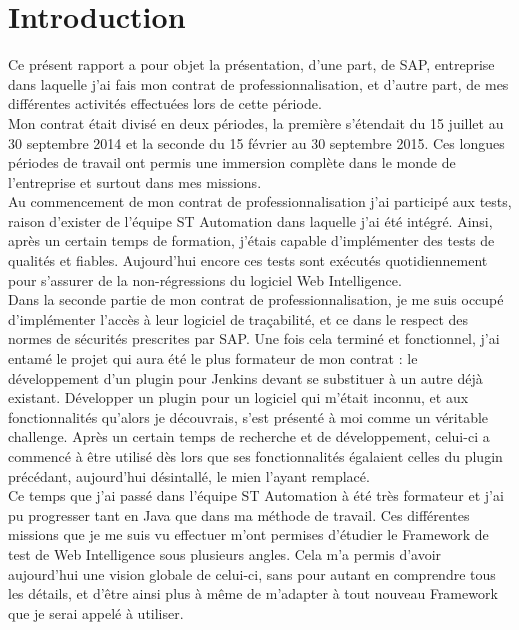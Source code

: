 \chapter*{Introduction}

Ce présent rapport a pour objet la présentation, d'une part, de SAP, entreprise dans laquelle j'ai fais mon contrat de professionnalisation, et d'autre part, de mes différentes activités effectuées lors de cette période.\\

Mon contrat était divisé en deux périodes, la première s'étendait du 15 juillet au 30 septembre 2014 et la seconde du 15 février au 30 septembre 2015. Ces longues périodes de travail ont permis une immersion complète dans le monde de l'entreprise et surtout dans mes missions.\\


Au commencement de mon contrat de professionnalisation j'ai participé aux tests, raison d'exister de l'équipe \gls{ST} Automation dans laquelle j'ai été intégré. Ainsi, après un certain temps de formation, j'étais capable d'implémenter des tests de qualités et fiables. Aujourd'hui encore ces tests sont exécutés quotidiennement pour s'assurer de la non-régressions du logiciel Web Intelligence.\\
Dans la seconde partie de mon contrat de professionnalisation, je me suis occupé d'implémenter l'accès \`{a} leur logiciel de traçabilité, et ce dans le respect des normes de sécurités prescrites par SAP. Une fois cela terminé et fonctionnel, j'ai entamé le projet qui aura été le plus formateur de mon contrat : le développement d'un plugin pour Jenkins devant se substituer à un autre déjà existant. Développer un plugin pour un logiciel qui m'était inconnu, et aux fonctionnalités qu'alors je découvrais, s'est présenté à moi comme un véritable challenge. Après un certain temps de recherche et de développement, celui-ci a commencé à être utilisé dès lors que ses fonctionnalités égalaient celles du plugin précédant, aujourd'hui désintallé, le mien l'ayant remplacé.\\

Ce temps que j'ai passé dans l'équipe ST Automation à été très formateur et j'ai pu progresser tant en Java que dans ma méthode de travail. Ces différentes missions que je me suis vu effectuer m'ont permises d'étudier le Framework de test de Web Intelligence sous plusieurs angles. Cela m'a permis d'avoir aujourd'hui une vision globale de celui-ci, sans pour autant en comprendre tous les détails, et d'être ainsi plus à même de m'adapter à tout nouveau Framework que je serai appelé à utiliser.